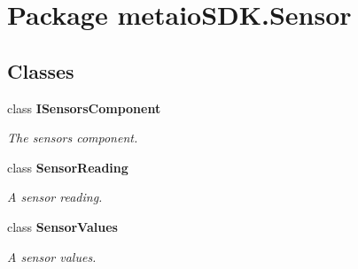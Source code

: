 \section{Package metaio\-S\-D\-K.\-Sensor}
\label{namespacemetaio_s_d_k_1_1_sensor}
\subsection*{Classes}
\begin{DoxyCompactItemize}
\item 
class {\bf I\-Sensors\-Component}
\begin{DoxyCompactList}\small\item\em The sensors component. \end{DoxyCompactList}\item 
class {\bf Sensor\-Reading}
\begin{DoxyCompactList}\small\item\em A sensor reading. \end{DoxyCompactList}\item 
class {\bf Sensor\-Values}
\begin{DoxyCompactList}\small\item\em A sensor values. \end{DoxyCompactList}\end{DoxyCompactItemize}
